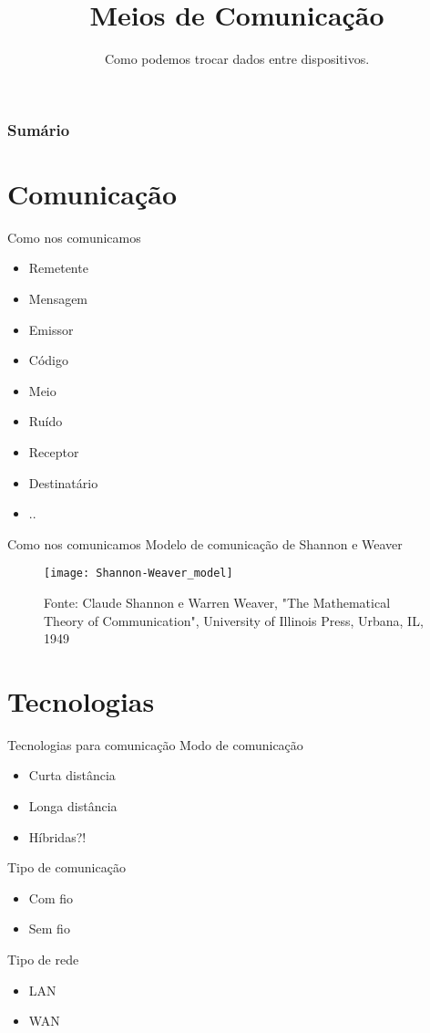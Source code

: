 \documentclass[t]{beamer}
\title{Meios de Comunicação}
\subtitle{Como podemos trocar dados entre dispositivos.}
\begin{document}
\frame{\titlepage}

\begin{frame}
\frametitle{Sumário}
\tableofcontents
\end{frame}

\section{Comunicação}

\begin{frame}{Como nos comunicamos}
\begin{itemize}
	\item Remetente
	\item Mensagem
	\item Emissor
	\item Código
	\item Meio
	\item Ruído
	\item Receptor
	\item Destinatário
	\item ..
\end{itemize}
\end{frame}


\begin{frame}{Como nos comunicamos}
Modelo de comunicação de Shannon e Weaver
\begin{figure}
	\texttt{[image: Shannon-Weaver\_model]}
	
	\scriptsize Fonte: Claude Shannon e Warren Weaver, "The Mathematical Theory of Communication", University of Illinois Press, Urbana, IL, 1949
\end{figure}
\end{frame}

\section{Tecnologias}

\begin{frame}{Tecnologias para comunicação}
Modo de comunicação
\begin{itemize}
	\item Curta distância
	\item Longa distância
	\item Híbridas?!
\end{itemize}
Tipo de comunicação
\begin{itemize}
	\item Com fio
	\item Sem fio
\end{itemize}
Tipo de rede
\begin{itemize}
	\item LAN
	\item WAN
\end{itemize}
\end{frame}
\end{document}
